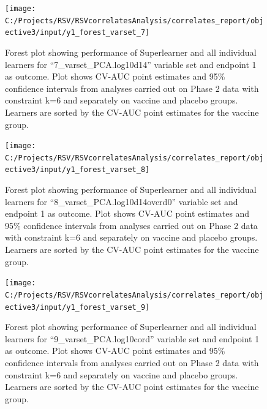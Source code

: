 \documentclass[11pt]{article}
\begin{document}
\begin{figure}[H]

{\centering \texttt{[image: C:/Projects/RSV/RSVcorrelatesAnalysis/correlates\_report/objective3/input/y1\_forest\_varset\_7]} 

}

\caption[Forest plot for ``7\_varset\_PCA.log10d14'' variable set, endpoint 1.]{Forest plot showing performance of Superlearner and all individual learners for ``7\_varset\_PCA.log10d14'' variable set and endpoint 1 as outcome. Plot shows CV-AUC point estimates and 95\% confidence intervals from analyses carried out on Phase 2 data with constraint k=6 and separately on vaccine and placebo groups. Learners are sorted by the CV-AUC point estimates for the vaccine group.}\label{fig:y1-forest-varset-7}
\end{figure}

\begin{figure}[H]

{\centering \texttt{[image: C:/Projects/RSV/RSVcorrelatesAnalysis/correlates\_report/objective3/input/y1\_forest\_varset\_8]} 

}

\caption[Forest plot for ``8\_varset\_PCA.log10d14overd0'' variable set, endpoint 1.]{Forest plot showing performance of Superlearner and all individual learners for ``8\_varset\_PCA.log10d14overd0'' variable set and endpoint 1 as outcome. Plot shows CV-AUC point estimates and 95\% confidence intervals from analyses carried out on Phase 2 data with constraint k=6 and separately on vaccine and placebo groups. Learners are sorted by the CV-AUC point estimates for the vaccine group.}\label{fig:y1-forest-varset-8}
\end{figure}

\begin{figure}[H]

{\centering \texttt{[image: C:/Projects/RSV/RSVcorrelatesAnalysis/correlates\_report/objective3/input/y1\_forest\_varset\_9]} 

}

\caption[Forest plot for ``9\_varset\_PCA.log10cord'' variable set, endpoint 1.]{Forest plot showing performance of Superlearner and all individual learners for ``9\_varset\_PCA.log10cord'' variable set and endpoint 1 as outcome. Plot shows CV-AUC point estimates and 95\% confidence intervals from analyses carried out on Phase 2 data with constraint k=6 and separately on vaccine and placebo groups. Learners are sorted by the CV-AUC point estimates for the vaccine group.}\label{fig:y1-forest-varset-9}
\end{figure}
\end{document}
